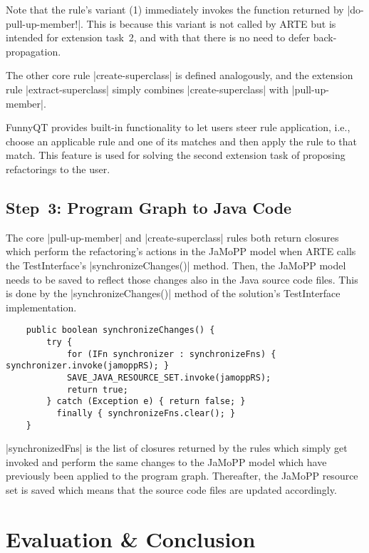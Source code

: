 \documentclass[submission]{eptcs}
\newcommand{\code}{\clojureinline}
\begin{document}
Note that the rule's variant (1) immediately invokes the function returned by
\code|do-pull-up-member!|.  This is because this variant is not called by ARTE
but is intended for extension task~2, and with that there is no need to defer
back-propagation.

The other core rule \code|create-superclass| is defined analogously, and the
extension rule \code|extract-superclass| simply combines
\code|create-superclass| with \code|pull-up-member|.

FunnyQT provides built-in functionality to let users steer rule application,
i.e., choose an applicable rule and one of its matches and then apply the rule
to that match.  This feature is used for solving the second extension task of
proposing refactorings to the user.


\subsection{Step~3: Program Graph to Java Code}
\label{sec:step-3:pg-to-java}

The core \code|pull-up-member| and \code|create-superclass| rules both return
closures which perform the refactoring's actions in the JaMoPP model when ARTE
calls the \textsf{TestInterface}'s \code|synchronizeChanges()| method.  Then,
the JaMoPP model needs to be saved to reflect those changes also in the Java
source code files.  This is done by the \code|synchronizeChanges()| method of
the solution's \textsf{TestInterface} implementation.

\begin{verbatim}
    public boolean synchronizeChanges() {
        try {
            for (IFn synchronizer : synchronizeFns) { synchronizer.invoke(jamoppRS); }
            SAVE_JAVA_RESOURCE_SET.invoke(jamoppRS);
            return true;
        } catch (Exception e) { return false; }
          finally { synchronizeFns.clear(); }
    }
\end{verbatim}

\code|synchronizedFns| is the list of closures returned by the rules which
simply get invoked and perform the same changes to the JaMoPP model which have
previously been applied to the program graph.  Thereafter, the JaMoPP resource
set is saved which means that the source code files are updated accordingly.


\section{Evaluation \& Conclusion}
\label{sec:evaluation}
\end{document}
